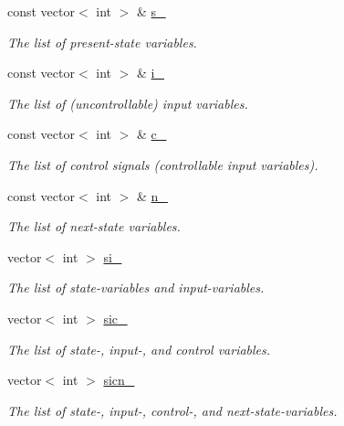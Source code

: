 \begin{DoxyCompactItemize}
const vector$<$ int $>$ \& \hyperlink{classLearnSynthSAT_a4892998e28f276d7b1a1b02e80799f76}{s\-\_\-}
\begin{DoxyCompactList}\small\item\em The list of present-\/state variables. \end{DoxyCompactList}\item 
const vector$<$ int $>$ \& \hyperlink{classLearnSynthSAT_ab5eac67e9f0f27b5b08f6a5e054d59c4}{i\-\_\-}
\begin{DoxyCompactList}\small\item\em The list of (uncontrollable) input variables. \end{DoxyCompactList}\item 
const vector$<$ int $>$ \& \hyperlink{classLearnSynthSAT_ad4c8ac8ca9b023a4a81fe7e3e2dcaa96}{c\-\_\-}
\begin{DoxyCompactList}\small\item\em The list of control signals (controllable input variables). \end{DoxyCompactList}\item 
const vector$<$ int $>$ \& \hyperlink{classLearnSynthSAT_a00af554fd3553881b45182300756ca0e}{n\-\_\-}
\begin{DoxyCompactList}\small\item\em The list of next-\/state variables. \end{DoxyCompactList}\item 
vector$<$ int $>$ \hyperlink{classLearnSynthSAT_a49633abdda013c437cad8f25914eeb1f}{si\-\_\-}
\begin{DoxyCompactList}\small\item\em The list of state-\/variables and input-\/variables. \end{DoxyCompactList}\item 
vector$<$ int $>$ \hyperlink{classLearnSynthSAT_af771f52e55a36e1d685aa198a1942cd8}{sic\-\_\-}
\begin{DoxyCompactList}\small\item\em The list of state-\/, input-\/, and control variables. \end{DoxyCompactList}\item 
vector$<$ int $>$ \hyperlink{classLearnSynthSAT_a2eb9ea7dbeb1eb04011e02a16fe2917d}{sicn\-\_\-}
\begin{DoxyCompactList}\small\item\em The list of state-\/, input-\/, control-\/, and next-\/state-\/variables. \end{DoxyCompactList}\end{DoxyCompactItemize}
